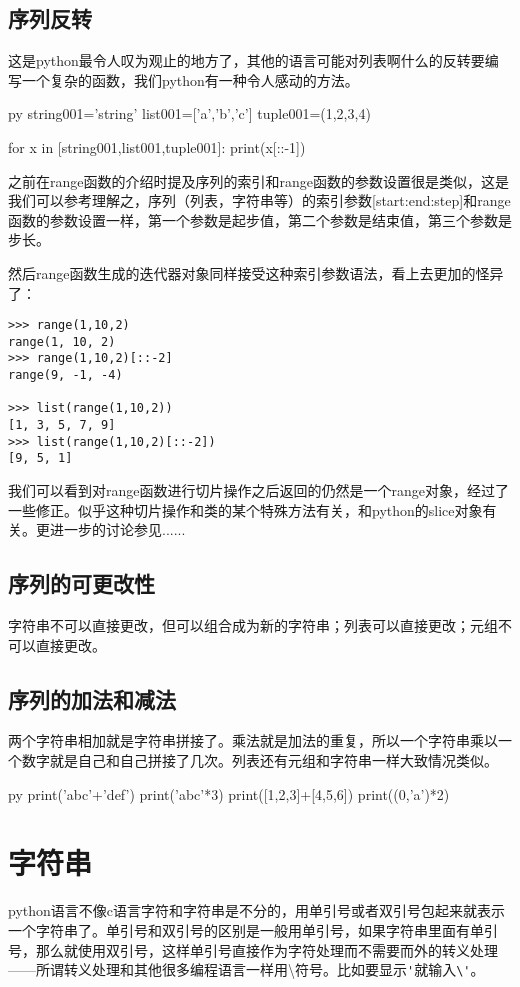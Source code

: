\documentclass[12pt,oneside]{book}
\begin{document}
\begin{common-format}
\subsection{序列反转}
这是python最令人叹为观止的地方了，其他的语言可能对列表啊什么的反转要编写一个复杂的函数，我们python有一种令人感动的方法。

\begin{xverbatim}[129]{py}
string001='string'
list001=['a','b','c']
tuple001=(1,2,3,4)

for x in [string001,list001,tuple001]:
    print(x[::-1])
\end{xverbatim}

之前在range函数的介绍时提及序列的索引和range函数的参数设置很是类似，这是我们可以参考理解之，序列（列表，字符串等）的索引参数[start:end:step]和range函数的参数设置一样，第一个参数是起步值，第二个参数是结束值，第三个参数是步长。

然后range函数生成的迭代器对象同样接受这种索引参数语法，看上去更加的怪异了：
\begin{Verbatim}
>>> range(1,10,2)
range(1, 10, 2)
>>> range(1,10,2)[::-2]
range(9, -1, -4)

>>> list(range(1,10,2))
[1, 3, 5, 7, 9]
>>> list(range(1,10,2)[::-2])
[9, 5, 1]
\end{Verbatim}
我们可以看到对range函数进行切片操作之后返回的仍然是一个range对象，经过了一些修正。似乎这种切片操作和类的某个特殊方法有关，和python的slice对象有关。更进一步的讨论参见......



\subsection{序列的可更改性}
字符串不可以直接更改，但可以组合成为新的字符串；列表可以直接更改；元组不可以直接更改。



\subsection{序列的加法和减法}
两个字符串相加就是字符串拼接了。乘法就是加法的重复，所以一个字符串乘以一个数字就是自己和自己拼接了几次。列表还有元组和字符串一样大致情况类似。

\begin{xverbatim}[129]{py}
print('abc'+'def')
print('abc'*3)
print([1,2,3]+[4,5,6])
print((0,'a')*2)
\end{xverbatim}



\section{字符串}
python语言不像c语言字符和字符串是不分的，用单引号或者双引号包起来就表示一个字符串了。单引号和双引号的区别是一般用单引号，如果字符串里面有单引号，那么就使用双引号，这样单引号直接作为字符处理而不需要而外的转义处理——所谓转义处理和其他很多编程语言一样用\textbackslash 符号。比如要显示\verb+'+就输入\verb+\'+。


\end{common-format}
\end{document}
